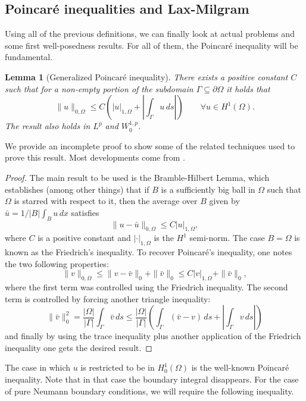 \documentclass{article}
\newtheorem{lemma}{Lemma}
\begin{document}
\subsection{Poincaré inequalities and Lax-Milgram}


Using all of the previous definitions, we can finally look at actual problems and some first well-posedness results. For all of them, the Poincaré inequality will be fundamental.

\begin{lemma}[Generalized Poincaré inequality] There exists a positive constant $C$ such that for a non-empty portion of the subdomain $\Gamma \subseteq \partial\Omega$ it holds that
        $$ \| u \|_{0,\Omega} \leq C\left(| u |_{1,\Omega} + \left|\int_\Gamma u\,ds\right| \right) \qquad \forall u \in H^1(\Omega). $$
The result also holds in $L^p$ and $W_0^{1,p}$. 
\end{lemma}

We provide an incomplete proof to show some of the related techniques used to prove this result. Most developments come from \cite{brenner2008mathematical}.
\begin{proof}
    The main result to be used is the Bramble-Hilbert Lemma, which establishes (among other things) that if $B$ is a sufficiently big ball in $\Omega$ such that $\Omega$ is starred with respect to it, then the average over $B$ given by $\bar u = 1/|B|\int_B u\,dx$ satisfies
    $$ \| u - \bar u \|_{0,\Omega} \leq C| u |_{1,\Omega}, $$
where $C$ is a positive constant and $|\cdot|_{1,\Omega}$ is the $H^1$ semi-norm. The case $B=\Omega$ is known as the Friedrich's inequality. To recover Poincaré's inequality, one notes the two following properties: 
    $$ \|v \|_{0,\Omega} \leq \| v - \bar v\|_0 + \| \bar v\|_0 \leq C | v |_{1,\Omega} + \|\bar v\|_0,$$
where the first term was controlled using the Friedrich inequality. The second term is controlled by forcing another triangle inequality: 
    $$ \| \bar v\|^2_0 = \frac{|\Omega|}{|\Gamma|} \int_\Gamma \bar v\,ds \leq \frac{|\Omega|}{|\Gamma|}\left(\int_\Gamma (\bar v - v)\,ds + \left| \int_\Gamma v \,ds \right| \right)$$
and finally by using the trace inequality plus another application of the Friedrich inequality one gets the desired result. 
\end{proof}

The case in which $u$ is restricted to be in $H_0^1(\Omega)$ is the well-known Poincaré inequality. Note that in that case the boundary integral disappears. For the case of pure Neumann boundary conditions, we will require the following inequality.
\end{document}
